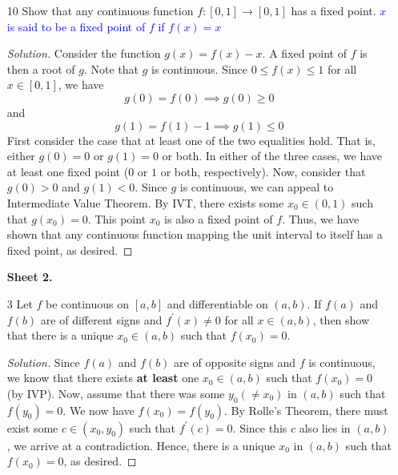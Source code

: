 \documentclass[12pt]{article}
\theoremstyle{definition}
\newenvironment{soln}{\begin{proof}[Solution]}{\end{proof}}
\begin{document}
\begin{enumerate}[leftmargin=*]
    \item[10] Show that any continuous function $f \colon [0,1] \rightarrow [0,1]$ has a fixed point. \textcolor{blue}{$x$ is said to be a fixed point of $f$ if $f(x) = x$}
    \begin{soln}
        Consider the function $g(x) = f(x) - x$. A fixed point of $f$ is then a root of $g$. Note that $g$ is continuous. Since $0 \leq f(x) \leq 1$ for all $x \in [0,1]$, we have
        \[
            g(0) = f(0) \implies g(0) \geq 0
        \]
        and
        \[
            g(1) = f(1) - 1 \implies g(1) \leq 0
        \]
        First consider the case that at least one of the two equalities hold. That is, either $g(0) = 0$ or $g(1) = 0$ or both. In either of the three cases, we have at least one fixed point ($0$ or $1$ or both, respectively). Now, consider that $g(0) > 0$ and $g(1) < 0$. Since $g$ is continuous, we can appeal to Intermediate Value Theorem. By IVT, there exists some $x_0 \in (0,1)$ such that $g(x_0) = 0$. This point $x_0$ is also a fixed point of $f$. Thus, we have shown that any continuous function mapping the unit interval to itself has a fixed point, as desired.
    \end{soln}
    
    \newpage
    
    \textbf{Sheet 2.}
    
    \item[3] Let $f$ be continuous on $[a,b]$ and differentiable on $(a,b)$. If $f(a)$ and $f(b)$ are of different signs and $f^{\prime}(x) \neq 0$ for all $x \in (a,b)$, then show that there is a unique $x_0 \in (a,b)$ such that $f(x_0) = 0$. 
    
    \begin{soln}
        Since $f(a)$ and $f(b)$ are of opposite signs and $f$ is continuous, we know that there exists \textbf{at least} one $x_0 \in (a,b)$ such that $f(x_0) = 0$ (by IVP). Now, assume that there was some $y_0 (\neq x_0)$ in $(a,b)$ such that $f(y_0) = 0$. We now have $f(x_0) = f(y_0)$. By Rolle's Theorem, there must exist some $c \in (x_0, y_0)$ such that $f^{\prime}(c) = 0$. Since this $c$ also lies in $(a,b)$, we arrive at a contradiction. Hence, there is a unique $x_0$ in $(a,b)$ such that $f(x_0) = 0$, as desired.
    \end{soln}
    

\end{enumerate}
\end{document}
